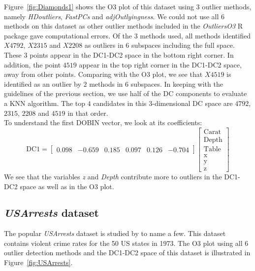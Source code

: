 \documentclass[11pt]{article}
\begin{document}
Figure~\ref{fig:Diamonds1} shows the O3 plot of this dataset using $3$ outlier methods, namely \textit{HDoutliers}, \textit{FastPCs} and \textit{adjOutlyingness}. We could not use all $6$ methods on this dataset as other outlier methods included in the \textit{OutliersO3} R package gave computational errors. Of the $3$ methods used, all methods identified $X4792$, $X2315$ and $X2208$ as outliers in 6 subspaces including the full space. These $3$ points appear in the DC1-DC2 space in the bottom right corner. In addition, the point $4519$ appear in the top right corner in the DC1-DC2 space, away from other points. Comparing with the O3 plot, we see that $X4519$ is identified as an outlier by $2$ methods in $6$ subspaces. In keeping with the guidelines of the previous section, we use half of the DC components to evaluate a KNN algorithm. The top $4$ candidates in this $3$-dimensional DC space are $4792$, $2315$, $2208$ and $4519$ in that order. \\

To understand the first DOBIN vector, we look at its coefficients:
\begin{equation}\label{eq:ResWithVis2}
    \text{DC1} = \begin{bmatrix}
    0.098 & -0.659 &  0.185 & 0.097  & 0.126 & -0.704  
    \end{bmatrix}
    \begin{bmatrix}
    \text{Carat} \\
    \text{Depth} \\
    \text{Table} \\
    \text{x} \\
    \text{y} \\
    \text{z}
    \end{bmatrix}
\end{equation}
We see that the variables \textit{z} and \textit{Depth} contribute more  to  outliers in the DC1-DC2 space as well as in the O3 plot. 


\subsection{\textit{USArrests} dataset}\label{sec:ResWithVis3}
The popular \textit{USArrests} dataset  is studied by \cite{bailey1995interactive, sarkar2008labels, yaminiviolent} to name a few. This dataset contains violent crime rates for the 50 US states in 1973. The O3 plot using all $6$ outlier detection methods and the DC1-DC2 space of this dataset is illustrated in Figure~\ref{fig:USArrests}. 
\end{document}

